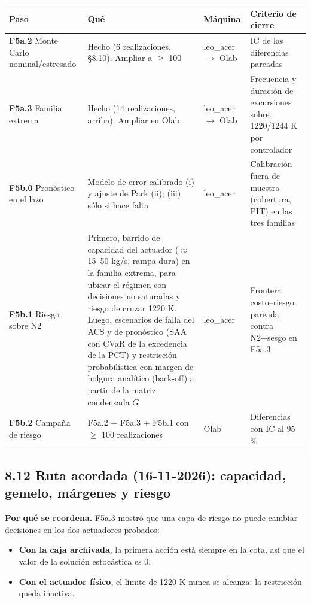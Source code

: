 \documentclass[11pt,a4paper]{article}
\begin{document}
{\footnotesize
\begin{xltabular}{\linewidth}{@{}YYYY@{}}
\toprule
\textbf{Paso} & \textbf{Qué} & \textbf{Máquina} & \textbf{Criterio de cierre} \\
\midrule
\endhead
\textbf{F5a.2} Monte Carlo nominal/estresado & Hecho (6 realizaciones, \S{}8.10). Ampliar a $\ge$ 100 & leo\_acer $\to$ Olab & IC de las diferencias pareadas \\
\textbf{F5a.3} Familia extrema & Hecho (14 realizaciones, arriba). Ampliar en Olab & leo\_acer $\to$ Olab & Frecuencia y duración de excursiones sobre 1220/1244 K por controlador \\
\textbf{F5b.0} Pronóstico en el lazo & Modelo de error calibrado (i) y ajuste de Park (ii); (iii) sólo si hace falta & leo\_acer & Calibración fuera de muestra (cobertura, PIT) en las tres familias \\
\textbf{F5b.1} Riesgo sobre N2 & Primero, barrido de capacidad del actuador ($\approx$ 15–50 kg/s, rampa dura) en la familia extrema, para ubicar el régimen con decisiones no saturadas y riesgo de cruzar 1220 K. Luego, escenarios de falla del ACS y de pronóstico (SAA con CVaR de la excedencia de la PCT) y restricción probabilística con margen de holgura analítico (back-off) a partir de la matriz condensada $G$ & leo\_acer & Frontera costo–riesgo pareada contra N2+sesgo en F5a.3 \\
\textbf{F5b.2} Campaña de riesgo & F5a.2 + F5a.3 + F5b.1 con $\ge$ 100 realizaciones & Olab & Diferencias con IC al 95 \% \\
\bottomrule
\end{xltabular}}

\subsection*{8.12 Ruta acordada (16-11-2026): capacidad, gemelo, márgenes y riesgo}
\textbf{Por qué se reordena.} F5a.3 mostró que una capa de riesgo no puede cambiar decisiones en los dos actuadores probados:

\begin{itemize}
\item \textbf{Con la caja archivada}, la primera acción está siempre en la cota, así que el valor de la solución estocástica es 0.
\item \textbf{Con el actuador físico}, el límite de 1220 K nunca se alcanza: la restricción queda inactiva.
\end{itemize}
\end{document}
